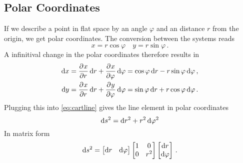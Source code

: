 \subsection*{Polar Coordinates}
If we describe a point in flat space by an angle $\varphi$ and an distance $r$
from the origin, we get polar coordinates. The conversion between the systems
reads
\begin{equation}
    x= r\cos\varphi\quad y= r\sin\varphi\,.
\end{equation}
A infinitival change in the polar coordinates therefore results in 
\begin{align}
    \dif x&= \dpd{x}{r}\dif r+\dpd{x}{\varphi}\dif \varphi = \cos\varphi\dif
    r-r\sin\varphi\dif \varphi\,,\\
    \dif y&= \dpd{x}{r}\dif r+\dpd{y}{\varphi}\dif \varphi = \sin\varphi\dif
    r+r\cos\varphi\dif \varphi\,.
\end{align}
Plugging this into \eqref{eq:cartline} gives the line element in polar coordinates
\begin{equation}
    \dif s^2=\dif r^2+r^2\dif \varphi^2
\end{equation}
In matrix form
\begin{equation}
    \dif s^2=
    \begin{bmatrix}
        \dif r& \dif \varphi
    \end{bmatrix}
    \begin{bmatrix}
        1& 0\\
        0& r^2\\
    \end{bmatrix}
    \begin{bmatrix}
        \dif r\\ \dif \varphi
    \end{bmatrix}\, .
\end{equation}
